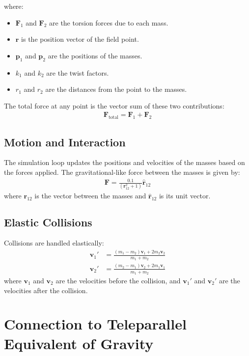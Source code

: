 \documentclass{article}
\begin{document}
where:
\begin{itemize}
    \item $\mathbf{F}_1$ and $\mathbf{F}_2$ are the torsion forces due to each mass.
    \item $\mathbf{r}$ is the position vector of the field point.
    \item $\mathbf{p}_1$ and $\mathbf{p}_2$ are the positions of the masses.
    \item $k_1$ and $k_2$ are the twist factors.
    \item $r_1$ and $r_2$ are the distances from the point to the masses.
\end{itemize}

The total force at any point is the vector sum of these two contributions:
\begin{align}
\mathbf{F}_{\text{total}} = \mathbf{F}_1 + \mathbf{F}_2
\end{align}

\subsection{Motion and Interaction}
The simulation loop updates the positions and velocities of the masses based on the forces applied. The gravitational-like force between the masses is given by:
\begin{align}
\mathbf{F} = \frac{0.1}{(\mathbf{r}_{12}^2 + 1)} \hat{\mathbf{r}}_{12}
\end{align}
where $\mathbf{r}_{12}$ is the vector between the masses and $\hat{\mathbf{r}}_{12}$ is its unit vector.

\subsection{Elastic Collisions}
Collisions are handled elastically:
\begin{align}
\mathbf{v}_1' &= \frac{(m_1 - m_2) \mathbf{v}_1 + 2 m_2 \mathbf{v}_2}{m_1 + m_2} \\
\mathbf{v}_2' &= \frac{(m_2 - m_1) \mathbf{v}_2 + 2 m_1 \mathbf{v}_1}{m_1 + m_2}
\end{align}
where $\mathbf{v}_1$ and $\mathbf{v}_2$ are the velocities before the collision, and $\mathbf{v}_1'$ and $\mathbf{v}_2'$ are the velocities after the collision.

\section{Connection to Teleparallel Equivalent of Gravity}
\end{document}
